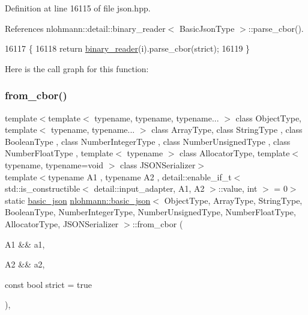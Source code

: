 Definition at line 16115 of file json.\+hpp.



References nlohmann\+::detail\+::binary\+\_\+reader$<$ Basic\+Json\+Type $>$\+::parse\+\_\+cbor().


\begin{DoxyCode}
16117     \{
16118         \textcolor{keywordflow}{return} \hyperlink{classnlohmann_1_1basic__json_a7e06ed27ff517575ccb23fc23fca2b8f}{binary\_reader}(i).parse\_cbor(strict);
16119     \}
\end{DoxyCode}
Here is the call graph for this function\+:
\mbox{\label{classnlohmann_1_1basic__json_abc2393a8ce91f2cd25bc1c2ca96daf24}} 
\subsubsection{\texorpdfstring{from\+\_\+cbor()}{from\_cbor()}\hspace{0.1cm}{\footnotesize\ttfamily [2/2]}}
{\footnotesize\ttfamily template$<$template$<$ typename, typename, typename... $>$ class Object\+Type, template$<$ typename, typename... $>$ class Array\+Type, class String\+Type , class Boolean\+Type , class Number\+Integer\+Type , class Number\+Unsigned\+Type , class Number\+Float\+Type , template$<$ typename $>$ class Allocator\+Type, template$<$ typename, typename=void $>$ class J\+S\+O\+N\+Serializer$>$ \\
template$<$typename A1 , typename A2 , detail\+::enable\+\_\+if\+\_\+t$<$ std\+::is\+\_\+constructible$<$ detail\+::input\+\_\+adapter, A1, A2 $>$\+::value, int $>$  = 0$>$ \\
static \hyperlink{classnlohmann_1_1basic__json}{basic\+\_\+json} \hyperlink{classnlohmann_1_1basic__json}{nlohmann\+::basic\+\_\+json}$<$ Object\+Type, Array\+Type, String\+Type, Boolean\+Type, Number\+Integer\+Type, Number\+Unsigned\+Type, Number\+Float\+Type, Allocator\+Type, J\+S\+O\+N\+Serializer $>$\+::from\+\_\+cbor (\begin{DoxyParamCaption}\item[{A1 \&\&}]{a1,  }\item[{A2 \&\&}]{a2,  }\item[{const bool}]{strict = {\ttfamily true} }\end{DoxyParamCaption})\hspace{0.3cm}{\ttfamily [inline]}, {\ttfamily [static]}}




